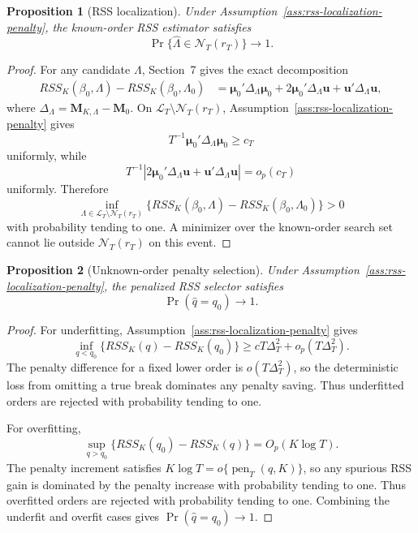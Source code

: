 \documentclass[12pt]{article}
\numberwithin{equation}{section}
\newtheorem{proposition}{Proposition}
\theoremstyle{definition}
\newcommand{\Op}{O_p}
\begin{document}
\begin{proposition}[RSS localization]
\label{prop:part2-rss-localization}
Under Assumption~\ref{ass:rss-localization-penalty}, the known-order RSS
estimator satisfies
\[
    \Pr\{\widehat\Lambda\in\mathcal N_T(r_T)\}\to1.
\]
\end{proposition}

\begin{proof}
For any candidate \(\Lambda\), Section~7 gives the exact decomposition
\[
\begin{aligned}
    RSS_K(\beta_0,\Lambda)-RSS_K(\beta_0,\Lambda_0)
    &=\bm\mu_0'\Delta_\Lambda\bm\mu_0
      +2\bm\mu_0'\Delta_\Lambda\bm u
      +\bm u'\Delta_\Lambda\bm u,
\end{aligned}
\]
where \(\Delta_\Lambda=\bm M_{K,\Lambda}-\bm M_0\). On
\(\mathcal L_T\setminus\mathcal N_T(r_T)\), Assumption~\ref{ass:rss-localization-penalty}
gives
\[
    T^{-1}\bm\mu_0'\Delta_\Lambda\bm\mu_0\ge c_T
\]
uniformly, while
\[
    T^{-1}|2\bm\mu_0'\Delta_\Lambda\bm u+\bm u'\Delta_\Lambda\bm u|=o_p(c_T)
\]
uniformly. Therefore
\[
    \inf_{\Lambda\in\mathcal L_T\setminus\mathcal N_T(r_T)}
    \{RSS_K(\beta_0,\Lambda)-RSS_K(\beta_0,\Lambda_0)\}>0
\]
with probability tending to one. A minimizer over the known-order search set
cannot lie outside \(\mathcal N_T(r_T)\) on this event.
\end{proof}

\begin{proposition}[Unknown-order penalty selection]
\label{prop:part2-order-selection}
Under Assumption~\ref{ass:rss-localization-penalty}, the penalized RSS selector
satisfies
\[
    \Pr(\widehat q=q_0)\to1.
\]
\end{proposition}

\begin{proof}
For underfitting, Assumption~\ref{ass:rss-localization-penalty} gives
\[
    \inf_{q<q_0}\{RSS_K(q)-RSS_K(q_0)\}
    \ge cT\Delta_T^2+o_p(T\Delta_T^2).
\]
The penalty difference for a fixed lower order is
\(o(T\Delta_T^2)\), so the deterministic loss from omitting a true break
dominates any penalty saving. Thus underfitted orders are rejected with
probability tending to one.

For overfitting,
\[
    \sup_{q>q_0}\{RSS_K(q_0)-RSS_K(q)\}=\Op(K\log T).
\]
The penalty increment satisfies \(K\log T=o\{\operatorname{pen}_T(q,K)\}\), so
any spurious RSS gain is dominated by the penalty increase with probability
tending to one. Thus overfitted orders are rejected with probability tending to
one. Combining the underfit and overfit cases gives \(\Pr(\widehat q=q_0)\to1\).
\end{proof}
\end{document}
